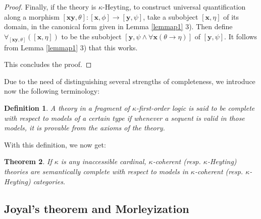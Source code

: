 \documentclass[a4paper,11pt]{article}
\theoremstyle{plain}
\newtheorem{thm}{Theorem}[subsection]
\theoremstyle{plain}
\newtheorem{defs}[thm]{Definition}
\theoremstyle{remark}
\begin{document}
\begin{proof}
Finally, if the theory is $\kappa$-Heyting, to construct universal quantification along a morphism $[\mathbf{x}\mathbf{y}, \theta]: [\mathbf{x}, \phi] \rightarrow [\mathbf{y}, \psi]$, take a subobject $[\mathbf{x}, \eta]$ of its domain, in the canonical form given in Lemma \ref{lemmap1} 3). Then define $\forall_{[\mathbf{x}\mathbf{y}, \theta]}([\mathbf{x}, \eta])$ to be the subobject $[\mathbf{y}, \psi \wedge \forall \mathbf{x} (\theta \to \eta)]$ of $[\mathbf{y}, \psi]$. It follows from Lemma \ref{lemmap1} 3) that this works.

This concludes the proof.\end{proof}

Due to the need of distinguishing several strengths of completeness, we introduce now the following terminology:

\begin{defs}
 A theory in a fragment of $\kappa$-first-order logic is said to be complete with respect to models of a certain type if whenever a sequent is valid in those models, it is provable from the axioms of the theory.
\end{defs}

With this definition, we now get:

\begin{thm}\label{cc}
 If $\kappa$ is any inaccessible cardinal, $\kappa$-coherent (resp. $\kappa$-Heyting) theories are semantically complete with respect to models in $\kappa$-coherent (resp. $\kappa$-Heyting) categories. 
\end{thm}

\subsection{Joyal's theorem and Morleyization}
\end{document}

